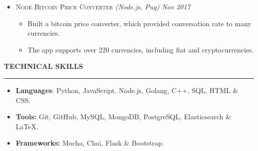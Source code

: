 \documentclass[a4paper, 12pt]{article}
\begin{document}
\begin{itemize}
\begin{itemize}
	\end{itemize}
\vspace{-0.4cm}
\item{\large{\textsc{Node Bitcoin Price Converter} \textit{(Node.js, Pug)\hspace{5.2cm} \normalsize{Nov 2017}}}}\vspace{-1.3cm}\newline
	\begin{itemize}
		\item{\small{Built a bitcoin price converter, which provided conversation rate to many currencies.}}\vspace{-0.4cm}
		\item{\small{The app supports over 220 currencies, including fiat and cryptocurrencies.}}
	\end{itemize}
\end{itemize}

\vspace{0.1cm}




\Large{\textbf{TECHNICAL SKILLS}}\vspace{-0.5cm}\newline
\rule{19cm}{0.01cm}
\vspace{-0.4cm}
\begin{itemize}
\item{\large{\textbf{Languages}: Python, JavaScript, Node.js, Golang, C++, SQL, HTML \& CSS.}\vspace{-0.4cm}}
\item{\large{\textbf{Tools:} Git, GitHub, MySQL, MongoDB, PostgreSQL, Elasticsearch  \& \LaTeX .}\vspace{-0.4cm}}
\item{\large{\textbf{Frameworks:} Mocha, Chai, Flask \& Bootstrap.}}
\end{itemize}

\vspace{0.1cm}


\end{document}
